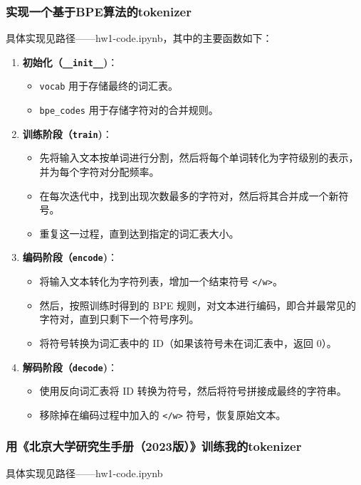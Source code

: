 \documentclass{article}
\begin{document}
\subsubsection{实现一个基于BPE算法的tokenizer}
具体实现见路径——hw1-code\bpe\bpe.ipynb，其中的主要函数如下：
\begin{enumerate}
    \item \textbf{初始化（\texttt{\_\_init\_\_})}：
    \begin{itemize}
        \item \texttt{vocab} 用于存储最终的词汇表。
        \item \texttt{bpe\_codes} 用于存储字符对的合并规则。
    \end{itemize}

    \item \textbf{训练阶段（\texttt{train})}：
    \begin{itemize}
        \item 先将输入文本按单词进行分割，然后将每个单词转化为字符级别的表示，并为每个字符对分配频率。
        \item 在每次迭代中，找到出现次数最多的字符对，然后将其合并成一个新符号。
        \item 重复这一过程，直到达到指定的词汇表大小。
    \end{itemize}

    \item \textbf{编码阶段（\texttt{encode})}：
    \begin{itemize}
        \item 将输入文本转化为字符列表，增加一个结束符号 \texttt{</w>}。
        \item 然后，按照训练时得到的 BPE 规则，对文本进行编码，即合并最常见的字符对，直到只剩下一个符号序列。
        \item 将符号转换为词汇表中的 ID（如果该符号未在词汇表中，返回 0）。
    \end{itemize}

    \item \textbf{解码阶段（\texttt{decode})}：
    \begin{itemize}
        \item 使用反向词汇表将 ID 转换为符号，然后将符号拼接成最终的字符串。
        \item 移除掉在编码过程中加入的 \texttt{</w>} 符号，恢复原始文本。
    \end{itemize}
\end{enumerate}

\subsubsection{用《北京大学研究生手册（2023版）》训练我的tokenizer}
具体实现见路径——hw1-code\bpe\bpe.ipynb
\end{document}
